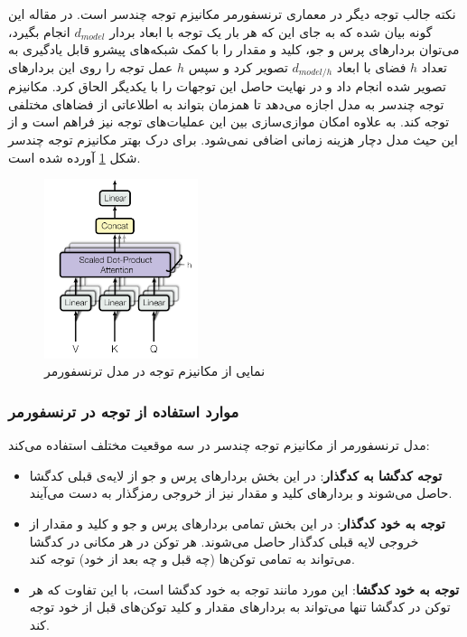 نکته جالب توجه دیگر در معماری ترنسفورمر مکانیزم توجه چندسر است. در مقاله این گونه بیان شده که به جای این که هر بار یک توجه با ابعاد بردار 
$d_{model}$
انجام بگیرد، می‌توان بردارهای پرس و جو، کلید و مقدار را با کمک شبکه‌های پیشرو قابل یادگیری به تعداد
$h$
فضای با ابعاد
$d_{model/h}$
تصویر کرد و سپس 
$h$
عمل توجه را روی این بردار‌های تصویر شده انجام داد و در نهایت حاصل این توجهات را با یکدیگر الحاق کرد. مکانیزم توجه چندسر به مدل اجازه می‌دهد تا همزمان بتواند به اطلاعاتی از فضاهای 
مختلفی توجه کند. به علاوه امکان موازی‌سازی بین این عملیات‌های توجه نیز فراهم است و از این حیث مدل دچار هزینه زمانی اضافی نمی‌شود. برای درک بهتر مکانیزم توجه چندسر شکل 
\ref{fig:chap3:transformer_multihead}
آورده شده است.
\begin{figure}[h]
	\centering
	\includegraphics[width=0.4\textwidth]{images/chap3/transformer_multihead.png}
	\caption{
		نمایی از مکانیزم توجه در مدل ترنسفورمر
		\cite{transformer}
	}
	\label{fig:chap3:transformer_multihead}
\end{figure}


\subsubsection{موارد استفاده از توجه در ترنسفورمر}
مدل ترنسفورمر از مکانیزم توجه چندسر در سه موقعیت مختلف استفاده می‌کند:

\begin{itemize}
	\item 
	\textbf{توجه کدگشا به کدگذار}:
	در این بخش بردار‌های پرس و جو از لایه‌ی‌ قبلی کدگشا حاصل می‌شوند و بردارهای کلید و مقدار نیز از خروجی رمزگذار به دست می‌آیند.
	
	\item 
	\textbf{توجه به خود کدگذار}:
	در این بخش تمامی بردارهای پرس و جو و کلید و مقدار از خروجی لایه قبلی کدگذار حاصل می‌شوند. هر توکن در هر مکانی در کدگشا می‌تواند به تمامی توکن‌ها (چه قبل و چه بعد از خود) توجه کند.
	
	\item
	\textbf{توجه به خود کدگشا}:
	این مورد مانند توجه به خود کدگشا است، با این تفاوت که هر توکن در کدگشا تنها می‌تواند به بردارهای مقدار و کلید توکن‌های قبل از خود توجه کند.
	
	
\end{itemize}

